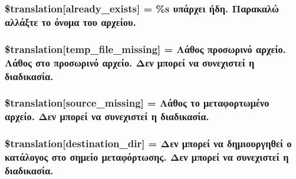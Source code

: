 \subsubsection[{\$translation}]{\setlength{\rightskip}{0pt plus 5cm}\$translation\mbox{[}\textquotesingle{}already\+\_\+exists\textquotesingle{}\mbox{]} = \textquotesingle{}\%s υπάρχει ήδη. Παρακαλώ αλλάξτε το όνομα του αρχείου.\textquotesingle{}}\label{class_8upload_8el___g_r_8php_afd84e910217f04139f567c41e292afa5}
\hypertarget{class_8upload_8el___g_r_8php_ab0fa87a88aba2624004581eed0633325}{}
\subsubsection[{\$translation}]{\setlength{\rightskip}{0pt plus 5cm}\$translation\mbox{[}\textquotesingle{}temp\+\_\+file\+\_\+missing\textquotesingle{}\mbox{]} = \textquotesingle{}Λάθος προσωρινό αρχείο. Λάθος στο προσωρινό αρχείο. Δεν μπορεί να συνεχιστεί η διαδικασία.\textquotesingle{}}\label{class_8upload_8el___g_r_8php_ab0fa87a88aba2624004581eed0633325}
\hypertarget{class_8upload_8el___g_r_8php_aceaaf7355acaaf10f0ae60378d03c468}{}
\subsubsection[{\$translation}]{\setlength{\rightskip}{0pt plus 5cm}\$translation\mbox{[}\textquotesingle{}source\+\_\+missing\textquotesingle{}\mbox{]} = \textquotesingle{}Λάθος το μεταφορτωμένο αρχείο. Δεν μπορεί να συνεχιστεί η διαδικασία.\textquotesingle{}}\label{class_8upload_8el___g_r_8php_aceaaf7355acaaf10f0ae60378d03c468}
\hypertarget{class_8upload_8el___g_r_8php_aff2427c72a2598aefa6d58df1dd18b08}{}
\subsubsection[{\$translation}]{\setlength{\rightskip}{0pt plus 5cm}\$translation\mbox{[}\textquotesingle{}destination\+\_\+dir\textquotesingle{}\mbox{]} = \textquotesingle{}Δεν μπορεί να δημιουργηθεί ο κατάλογος στο σημείο μεταφόρτωσης. Δεν μπορεί να συνεχιστεί η διαδικασία.\textquotesingle{}}\label{class_8upload_8el___g_r_8php_aff2427c72a2598aefa6d58df1dd18b08}
\hypertarget{class_8upload_8el___g_r_8php_a9ef28d3cf09942c6c0a1e77fa09185e8}{}
